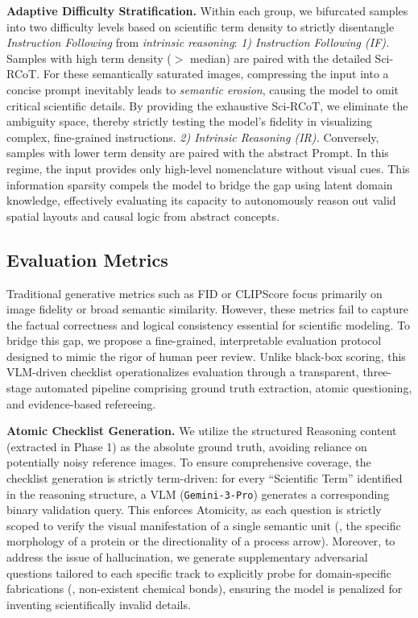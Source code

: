 \documentclass[runningheads]{llncs}
\begin{document}
\textbf{Adaptive Difficulty Stratification.} Within each group, we bifurcated samples into two difficulty levels based on scientific term density to strictly disentangle \textit{Instruction Following} from \textit{intrinsic reasoning}:
\textit{1) Instruction Following (IF).}
Samples with high term density ($>$ median) are paired with the detailed Sci-RCoT. For these semantically saturated images, compressing the input into a concise prompt inevitably leads to \textit{semantic erosion}, causing the model to omit critical scientific details. By providing the exhaustive Sci-RCoT, we eliminate the ambiguity space, thereby strictly testing the model's fidelity in visualizing complex, fine-grained instructions.
\textit{2) Intrinsic Reasoning (IR).}
Conversely, samples with lower term density are paired with the abstract Prompt. In this regime, the input provides only high-level nomenclature without visual cues. This information sparsity compels the model to bridge the gap using latent domain knowledge, effectively evaluating its capacity to autonomously reason out valid spatial layouts and causal logic from abstract concepts.

\subsection{Evaluation Metrics}
\label{sec:metric}
Traditional generative metrics such as FID\cite{heusel2017gans} or CLIPScore\cite{radford2021learning} focus primarily on image fidelity or broad semantic similarity. However, these metrics fail to capture the factual correctness and logical consistency essential for scientific modeling. To bridge this gap, we propose a fine-grained, interpretable evaluation protocol designed to mimic the rigor of human peer review. Unlike black-box scoring, this VLM-driven checklist operationalizes evaluation through a transparent, three-stage automated pipeline comprising ground truth extraction, atomic questioning, and evidence-based refereeing.

\textbf{Atomic Checklist Generation.} We utilize the structured Reasoning content (extracted in Phase 1) as the absolute ground truth, avoiding reliance on potentially noisy reference images. To ensure comprehensive coverage, the checklist generation is strictly term-driven: for every ``Scientific Term'' identified in the reasoning structure, a VLM (\texttt{Gemini-3-Pro}) generates a corresponding binary validation query. This enforces Atomicity, as each question is strictly scoped to verify the visual manifestation of a single semantic unit (\eg, the specific morphology of a protein or the directionality of a process arrow). Moreover, to address the issue of hallucination, we generate supplementary adversarial questions tailored to each specific track to explicitly probe for domain-specific fabrications (\eg, non-existent chemical bonds), ensuring the model is penalized for inventing scientifically invalid details.
\end{document}
